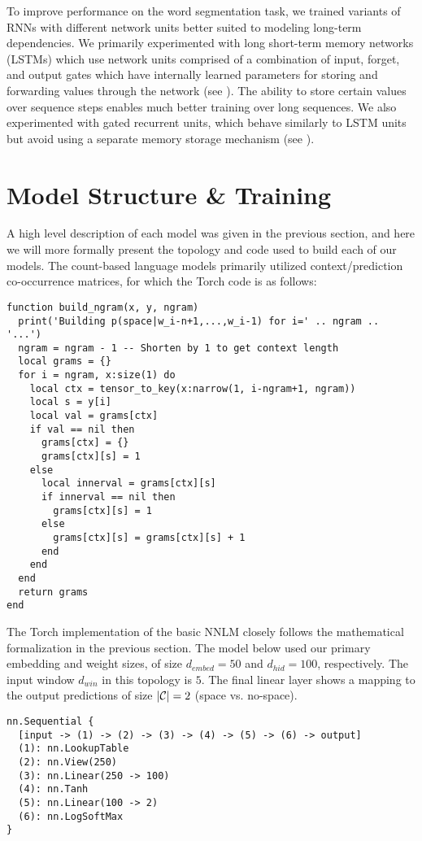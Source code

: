 \documentclass[11pt]{article}
\begin{document}
To improve performance on the word segmentation task, we trained variants of RNNs with different network units better suited to modeling long-term dependencies. We primarily experimented with long short-term memory networks (LSTMs) which use network units comprised of a combination of input, forget, and output gates which have internally learned parameters for storing and forwarding values through the network (see \citet{DBLP:journals/neco/HochreiterS97}). The ability to store certain values over sequence steps enables much better training over long sequences. We also experimented with gated recurrent units, which behave similarly to LSTM units but avoid using a separate memory storage mechanism (see \citet{DBLP:journals/corr/ChungGCB14}).

\section{Model Structure \& Training}

A high level description of each model was given in the previous section, and here we will more formally present the topology and code used to build each of our models. The count-based language models primarily utilized context/prediction co-occurrence matrices, for which the Torch code is as follows:
\begin{verbatim}
function build_ngram(x, y, ngram)
  print('Building p(space|w_i-n+1,...,w_i-1) for i=' .. ngram .. '...')
  ngram = ngram - 1 -- Shorten by 1 to get context length
  local grams = {}
  for i = ngram, x:size(1) do
    local ctx = tensor_to_key(x:narrow(1, i-ngram+1, ngram))
    local s = y[i]
    local val = grams[ctx]
    if val == nil then
      grams[ctx] = {}
      grams[ctx][s] = 1
    else
      local innerval = grams[ctx][s]
      if innerval == nil then
        grams[ctx][s] = 1
      else
        grams[ctx][s] = grams[ctx][s] + 1
      end
    end
  end
  return grams
end
\end{verbatim}

The Torch implementation of the basic NNLM closely follows the mathematical formalization in the previous section. The model below used our primary embedding and weight sizes, of size $d_{embed}=50$ and $d_{hid} = 100$, respectively. The input window $d_{win}$ in this topology is $5$. The final linear layer shows a mapping to the output predictions of size $|\mathcal{C}| = 2$ (space vs. no-space).
\begin{verbatim}
nn.Sequential {
  [input -> (1) -> (2) -> (3) -> (4) -> (5) -> (6) -> output]
  (1): nn.LookupTable
  (2): nn.View(250)
  (3): nn.Linear(250 -> 100)
  (4): nn.Tanh
  (5): nn.Linear(100 -> 2)
  (6): nn.LogSoftMax
}
\end{verbatim}
\end{document}

